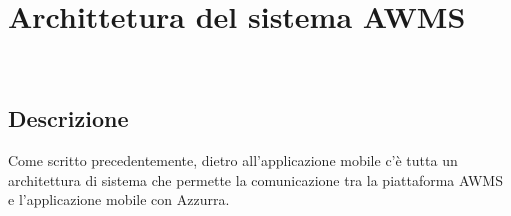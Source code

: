 \chapter{Archittetura del sistema AWMS}
\label{cap:archittettura del sistema AWMS}

\\


\section{Descrizione}
Come scritto precedentemente, dietro all'applicazione mobile c'è tutta un architettura di sistema che permette la comunicazione tra la piattaforma AWMS e l'applicazione mobile con Azzurra.
 
